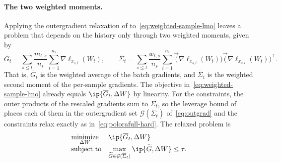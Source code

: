 \paragraph{The two weighted moments.} Applying the outergradient
relaxation of  to~\eqref{eq:weighted-sample-lmo}
leaves a problem that depends on the history only through two
weighted moments, given by
\[
\overline G_t=\sum_{s\le t}\frac{m_{t,s}}{n_s}\sum_{i=1}^{n_s}\nabla\ell_{x_{s,i}}(W_t),
\qquad
\overline\Sigma_t = \sum_{s\le t}\frac{w_{t,s}}{n_s}\sum_{i=1}^{n_s}
  \vec(\nabla\ell_{x_{s,i}}(W_t))\vec(\nabla\ell_{x_{s,i}}(W_t))^\top.
\]
That is, $\overline G_t$ is the weighted average of the batch
gradients, and $\overline\Sigma_t$ is the weighted second moment of
the per-sample gradients. The objective in~\eqref{eq:weighted-sample-lmo}
already equals $\ip{\overline G_t,\Delta W}$ by linearity. For the
constraints, the outer products of the rescaled gradients
sum to $\overline\Sigma_t$, so the leverage bound of 
places each of them in the outergradient set
$\mathcal{G}(\overline\Sigma_t)$ of~\eqref{eq:outgrad} and the
constraints relax exactly as in~\eqref{eq:polorafull-hard}. The relaxed problem is
\begin{equation}\label{eq:weighted-relaxed}
 \begin{array}{ll}
  \underset{\Delta W}{\mathrm{minimize}} &
  \ip{\overline G_t, \Delta W} \\[2pt]
  \mbox{subject to} &
  \displaystyle\max_{\widetilde{G}\in\mathcal{G}(\overline\Sigma_t)}\ip{\widetilde{G},\Delta W}\le\tau .
  \end{array}
\end{equation}

